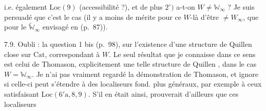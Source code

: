 i.e.  également $\mathrm{Loc}(9)$ (accessibilité ?),
et de plus $2^{\circ})$ a-t-on $W\ne\mathbb{W}_{\infty}$ ? Je
suis persuadé que c'est le cas (il
y a moins de mérite pour ce $W$-là
d'être $\ne W_{\infty}$, que pour le $\widetilde{\mathbb{W}}_{\infty}$
envisagé en  (p.~87)).

7.9. Oubli : la question 1 bis (p.~98),
sur l'existence d'une structure de Quillen
close sur $\mathrm{Cat}$, correspondant à $W$. Le
seul résultat que je connaisse dans
ce sens est celui de Thomason,
  explicitement une telle
structure de Quillen , dans le cas $W=\mathbb{W}_{\infty}$.
Je n'ai pas vraiment regardé la démonstration
de Thomason, et ignore si celle-ci
peut s'étendre à des localiseurs fond. plus
généraux, par exemple à ceux satisfaisant
$\mathrm{Loc}(6'\mathrm{a},8,9)$. S'il en était ainsi, 
prouverait d'ailleurs que ces localiseurs

